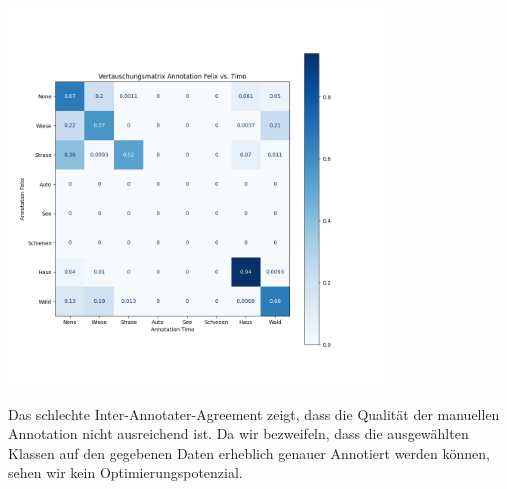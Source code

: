\begin{center}
\includegraphics[width=10cm]{../../data/inter_annotator_agreement/Vertauschungsmatrix_Annotation}
\end{center}

Das schlechte Inter-Annotater-Agreement zeigt, dass die Qualität der manuellen Annotation nicht ausreichend ist.
Da wir bezweifeln, dass die ausgewählten Klassen auf den gegebenen Daten erheblich genauer Annotiert werden können,
sehen wir kein Optimierungspotenzial.



